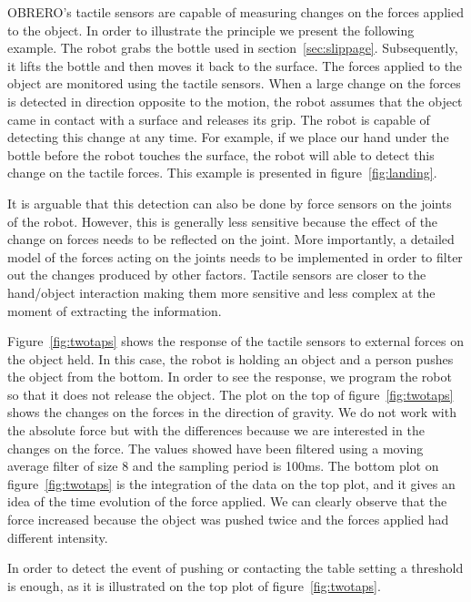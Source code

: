 OBRERO's tactile sensors are capable of measuring changes on the
forces applied to the object. In order to illustrate the principle
we present the following example. The robot grabs the bottle used
in section~\ref{sec:slippage}. Subsequently, it lifts the bottle
and then moves it back to the surface. The forces applied to the
object are monitored using the tactile sensors. When a large
change on the forces is detected in direction opposite to the
motion, the robot assumes that the object came in contact with a
surface and releases its grip. The robot is capable of detecting
this change at any time. For example, if we place our hand under
the bottle before the robot touches the surface, the robot will
able to detect this change on the tactile forces. This example is
presented in figure~\ref{fig:landing}.


It is arguable that this detection can also be done by force
sensors on the joints of the robot. However, this is generally
less sensitive because the effect of the change on forces needs to
be reflected on the joint. More importantly, a detailed model of
the forces acting on the joints needs to be implemented in order
to filter out the changes produced by other factors. Tactile
sensors are closer to the hand/object interaction making them more
sensitive and less complex at the moment of extracting the
information.

Figure~\ref{fig:twotaps} shows the response of the tactile sensors
to external forces on the object held. In this case, the robot is
holding an object and a person pushes the object from the bottom.
In order to see the response, we program the robot so that it does
not release the object. The plot on the top of
figure~\ref{fig:twotaps} shows the changes on the forces in the
direction of gravity.  We do not work with the absolute force but
with the differences because we are interested in the changes on
the force. The values showed have been filtered using a moving
average filter of size 8 and the sampling period is 100ms. The
bottom plot on figure~\ref{fig:twotaps} is the integration of the
data on the top plot, and it gives an idea of the time evolution
of the force applied. We can clearly observe that the force
increased because the object was pushed twice and the forces
applied had different intensity.

In order to detect the event of pushing or contacting the table
setting a threshold is enough, as it is illustrated on the top
plot of figure~\ref{fig:twotaps}.


